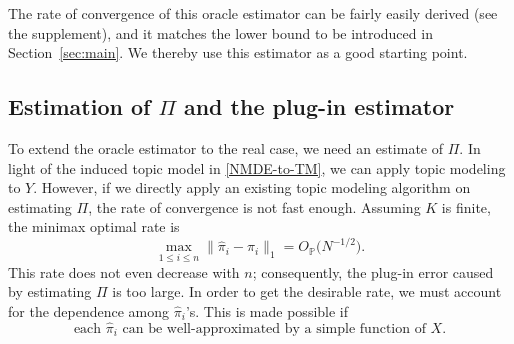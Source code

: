 \documentclass[preprint,11pt]{article}
\numberwithin{equation}{section}
\newcommand{\beq}{\begin{equation}}
\newcommand{\eeq}{\end{equation}}
\begin{document}


The rate of convergence of this oracle estimator can be fairly easily derived (see the supplement), and it matches the lower bound to be introduced in Section~\ref{sec:main}. We thereby use this estimator as a good starting point. 



\subsection{Estimation of $\Pi$ and the plug-in estimator} \label{subsec:estimate-Pi}
To extend the oracle estimator to the real case, we need an estimate of $\Pi$. In light of the induced topic model in \eqref{NMDE-to-TM}, we can apply topic modeling to $Y$. 
However, if we directly apply an existing topic modeling algorithm on estimating $\Pi$, the rate of convergence is not fast enough. Assuming $K$ is finite, the minimax optimal rate is \citep{klopp2023assigning,wu2023sparse}
\[
\max_{1\leq i\leq n}\|\hat\pi_i-\pi_i\|_1=O_{\mathbb{P}}\bigl(N^{-1/2}\bigr).
\]
This rate does not even decrease with $n$; consequently, the plug-in error caused by estimating $\Pi$ is too large. In order to get the desirable rate, we must account for the dependence among $\hat{\pi}_i$'s. This is made possible if 
\beq \label{hat-pi-requirement}
\mbox{each $\hat{\pi}_i$ can be well-approximated by a simple function of $X$}. 
\eeq
\end{document}
